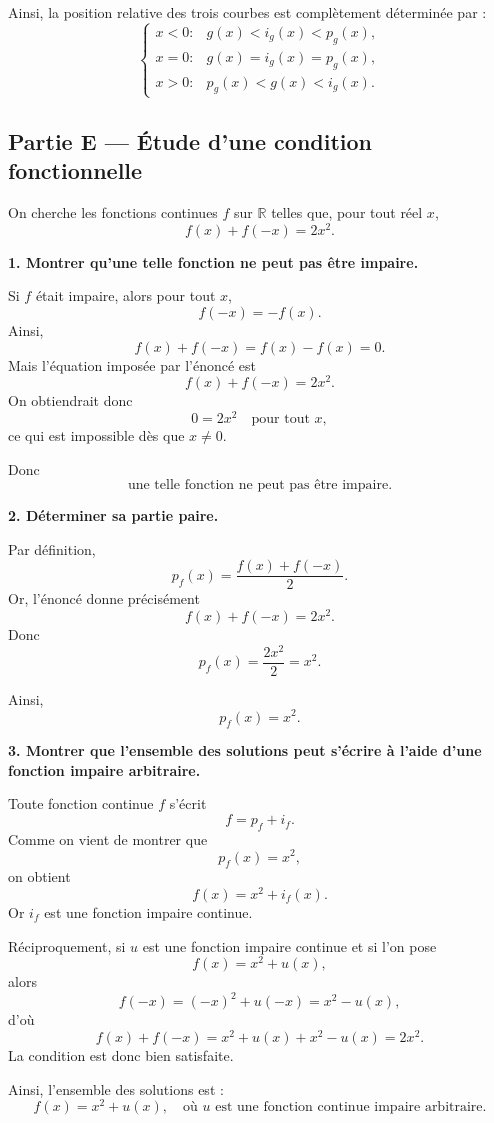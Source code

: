 \documentclass[11pt,a4paper]{article}
\newcommand{\R}{\mathbb{R}}
\begin{document}
Ainsi, la position relative des trois courbes est complètement déterminée par :
\[
\boxed{
\begin{cases}
x<0 : & g(x)<i_g(x)<p_g(x),\\[0.2cm]
x=0 : & g(x)=i_g(x)=p_g(x),\\[0.2cm]
x>0 : & p_g(x)<g(x)<i_g(x).
\end{cases}}
\]

\bigskip

\subsection*{Partie E --- Étude d'une condition fonctionnelle}

On cherche les fonctions continues \(f\) sur \(\R\) telles que, pour tout réel \(x\),
\[
f(x)+f(-x)=2x^2.
\]

\textbf{1. Montrer qu'une telle fonction ne peut pas être impaire.}

Si \(f\) était impaire, alors pour tout \(x\),
\[
f(-x)=-f(x).
\]
Ainsi,
\[
f(x)+f(-x)=f(x)-f(x)=0.
\]
Mais l'équation imposée par l'énoncé est
\[
f(x)+f(-x)=2x^2.
\]
On obtiendrait donc
\[
0=2x^2 \quad \text{pour tout } x,
\]
ce qui est impossible dès que \(x\neq 0\).

Donc
\[
\boxed{\text{une telle fonction ne peut pas être impaire.}}
\]

\bigskip

\textbf{2. Déterminer sa partie paire.}

Par définition,
\[
p_f(x)=\frac{f(x)+f(-x)}{2}.
\]
Or, l'énoncé donne précisément
\[
f(x)+f(-x)=2x^2.
\]
Donc
\[
p_f(x)=\frac{2x^2}{2}=x^2.
\]

Ainsi,
\[
\boxed{p_f(x)=x^2.}
\]

\bigskip

\textbf{3. Montrer que l'ensemble des solutions peut s'écrire à l'aide d'une fonction impaire arbitraire.}

Toute fonction continue \(f\) s'écrit
\[
f=p_f+i_f.
\]
Comme on vient de montrer que
\[
p_f(x)=x^2,
\]
on obtient
\[
f(x)=x^2+i_f(x).
\]
Or \(i_f\) est une fonction impaire continue.

Réciproquement, si \(u\) est une fonction impaire continue et si l'on pose
\[
f(x)=x^2+u(x),
\]
alors
\[
f(-x)=(-x)^2+u(-x)=x^2-u(x),
\]
d'où
\[
f(x)+f(-x)=x^2+u(x)+x^2-u(x)=2x^2.
\]
La condition est donc bien satisfaite.

Ainsi, l'ensemble des solutions est :
\[
\boxed{f(x)=x^2+u(x),\quad \text{où } u \text{ est une fonction continue impaire arbitraire.}}
\]
\end{document}
